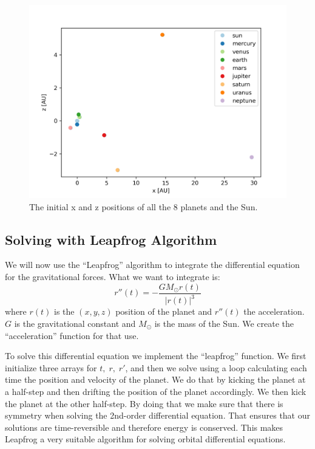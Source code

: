 \documentclass[a4paper,10pt]{article}
\begin{document}
\begin{figure}[H]
  \centering
  \includegraphics[width=.6\linewidth]{./plots/x-z.png}
  \caption{The initial x and z positions of all the 8 planets and the Sun.}
  \label{fig:x-z}
\end{figure}

\subsection{Solving with Leapfrog Algorithm}
\label{sec:leap}

We will now use the ``Leapfrog'' algorithm to integrate the differential equation for the gravitational forces. What we want to integrate is:
\begin{equation}
  r''(t) = - \frac{G M_{\odot}  r(t)}{|r(t)|^3}
\end{equation}
where $r(t)$ is the $(x,y,z)$ position of the planet and $r''(t)$ the acceleration. $G$ is the gravitational constant and $M_{\odot}$ is the mass of the Sun. We create the ``acceleration'' function for that use.

To solve this differential equation we implement the ``leapfrog'' function. We first initialize three arrays for $t,\;r,\;r'$, and then we solve using a loop calculating each time the position and velocity of the planet. We do that by kicking the planet at a half-step and then drifting the position of the planet accordingly. We then kick the planet at the other half-step. By doing that we make sure that there is symmetry when solving the 2nd-order differential equation. That ensures that our solutions are time-reversible and therefore energy is conserved. This makes Leapfrog a very suitable algorithm for solving orbital differential equations.


\end{document}
